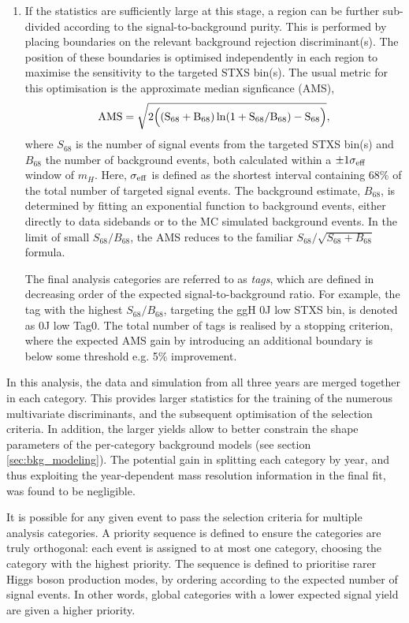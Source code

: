 \begin{enumerate}
    \item If the statistics are sufficiently large at this stage, a region can be further sub-divided according to the signal-to-background purity. This is performed by placing boundaries on the relevant background rejection discriminant(s). The position of these boundaries is optimised independently in each region to maximise the sensitivity to the targeted STXS bin(s). The usual metric for this optimisation is the approximate median signficance (AMS),
    \begin{equation}
        \rm{AMS} = \sqrt{2\Big((S_{68}+B_{68})\ln(1+S_{68}/B_{68})-S_{68}\Big)},
    \end{equation}
    \noindent
    where $S_{68}$ is the number of signal events from the targeted STXS bin(s) and $B_{68}$ the number of background events, both calculated within a $\pm1\sigma_{\rm{eff}}$ window of $m_H$. Here, $\sigma_{\rm{eff}}$ is defined as the shortest interval containing 68\% of the total number of targeted signal events. The background estimate, $B_{68}$, is determined by fitting an exponential function to background events, either directly to data sidebands or to the MC simulated background events. In the limit of small $S_{68}/B_{68}$, the AMS reduces to the familiar $S_{68}/\sqrt{S_{68}+B_{68}}$ formula.
    
    The final analysis categories are referred to as \textit{tags}, which are defined in decreasing order of the expected signal-to-background ratio. For example, the tag with the highest $S_{68}/B_{68}$, targeting the ggH 0J low \ptH STXS bin, is denoted as 0J low \ptgg Tag0. The total number of tags is realised by a stopping criterion, where the expected AMS gain by introducing an additional boundary is below some threshold e.g. 5\% improvement.
\end{enumerate}

In this analysis, the data and simulation from all three years are merged together in each category. This provides larger statistics for the training of the numerous multivariate discriminants, and the subsequent optimisation of the selection criteria. In addition, the larger yields allow to better constrain the shape parameters of the per-category background models (see section \ref{sec:bkg_modeling}). The potential gain in splitting each category by year, and thus exploiting the year-dependent mass resolution information in the final fit, was found to be negligible. 

It is possible for any given event to pass the selection criteria for multiple analysis categories. A priority sequence is defined to ensure the categories are truly orthogonal: each event is assigned to at most one category, choosing the category with the highest priority. The sequence is defined to prioritise rarer Higgs boson production modes, by ordering according to the expected number of signal events. In other words, global categories with a lower expected signal yield are given a higher priority.

